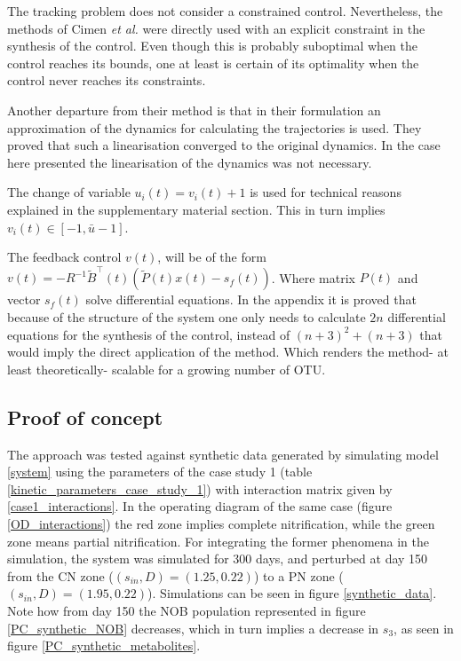 \documentclass[3p,times]{article}
\begin{document}
The tracking problem does not consider a constrained control. Nevertheless, the methods of Cimen \textit{et al.}\cite{Cimen2004} were directly used with an explicit constraint in the synthesis of the control. Even though this is probably suboptimal when the control reaches its bounds, one at least is certain of its optimality when the control never reaches its constraints.

Another departure from their method is that in their formulation an approximation of the dynamics for calculating the trajectories is used. They proved that such a linearisation converged to the original dynamics. In the case here presented the linearisation of the dynamics was not necessary.

The change of variable $u_i(t) = v_i(t) + 1$ is used for technical reasons explained in the supplementary material section. This in turn implies $v_i(t) \in [-1,\bar{u}-1]$.

The feedback control $v(t)$, will be of the form $v(t) = -R^{-1}\tilde{B}^\top(t)\left(\tilde{P}(t)x(t)-s_f(t)\right)$. Where matrix $P(t)$ and vector $s_f(t)$ solve differential equations. In the appendix it is proved that because of the structure of the system one only needs to calculate $2n$ differential equations for the synthesis of the control, instead of $(n+3)^2 + (n+3)$ that would imply the direct application of the method. Which renders the method- at least theoretically- scalable for a growing number of OTU.

\subsection{Proof of concept}

The approach was tested against synthetic data generated by simulating model \eqref{system} using the parameters of the case study 1 (table \ref{kinetic_parameters_case_study_1}) with interaction matrix given by \eqref{case1_interactions}. In the operating diagram of the same case (figure \eqref{OD_interactions}) the red zone implies complete nitrification, while the green zone means partial nitrification. For integrating the former phenomena in the simulation, the system was simulated for 300 days, and perturbed at day 150 from the CN zone ($(s_{in},D) = (1.25,0.22)$) to a PN zone ($(s_{in},D) = (1.95,0.22)$). Simulations can be seen in figure \ref{synthetic_data}. Note how from day 150 the NOB population represented in figure \eqref{PC_synthetic_NOB} decreases, which in turn implies a decrease in $s_3$, as seen in figure \eqref{PC_synthetic_metabolites}.
\end{document}

